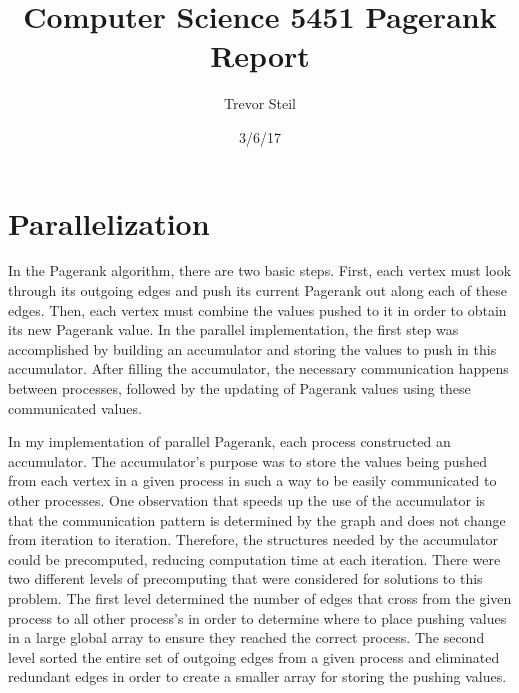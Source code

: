 \documentclass[a4paper]{article}
\title{Computer Science 5451 Pagerank Report }
\date{3/6/17}
\author{Trevor Steil}
\begin{document}
\maketitle

\section{Parallelization}

In the Pagerank algorithm, there are two basic steps. First, each vertex must look through its outgoing edges and push its current Pagerank out along
each of these edges. Then, each vertex must combine the values pushed to it in order to obtain its new Pagerank value. In the parallel implementation,
the first step was accomplished by building an accumulator and storing the values to push in this accumulator. After filling the accumulator, the
necessary communication happens between processes, followed by the updating of Pagerank values using these communicated values.

In my implementation of parallel Pagerank, each process constructed an accumulator. The accumulator's purpose was to store the values being pushed
from each vertex in a given process in such a way to be easily communicated to other processes. One observation that speeds up the use of the accumulator is that the communication pattern is determined by the
graph and does not change from iteration to iteration. Therefore, the structures needed by the accumulator could be precomputed, reducing computation
time at each iteration. There were two different levels of precomputing that were considered for solutions to this problem. The first level determined
the number of edges that cross from the given process to all other process's in order to determine where to place pushing values in a large global
array to ensure they reached the correct process. The second level sorted the entire set of outgoing edges from a given process and eliminated
redundant edges in order to create a smaller array for storing the pushing values.
\end{document}
